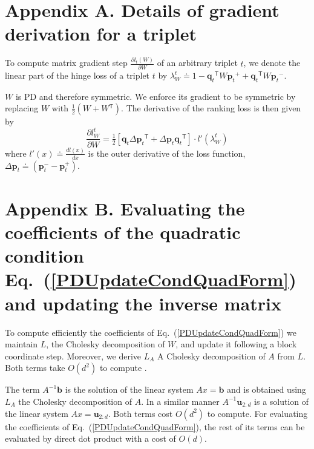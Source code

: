 \documentclass[twoside,11pt]{article}
\newcommand\mat[1]{{#1}}
\renewcommand\vec[1]{\mathbf{#1}}
\newcommand{\T}{{}^\mathsf{T}}
\newcommand{\W}{\mat{W}}
\newcommand{\eqdef}{\doteq}
\newcommand{\q}{{\vec{q}}}
\newcommand{\p}{{\vec{p}}}
\newcommand{\trip}{{t}}
\newcommand{\qt}{{\q_{\trip}}}
\newcommand{\pt}{{\p_{\trip}}}
\newcommand{\cholL}{\mat{L}}
\newcommand{\A}{\mat{A}}
\newcommand{\B}{\vec{b}}
\newcommand{\invA}{A^{-1}}
\newcommand{\uvec}{\vec{u}_{2:d}}
\renewcommand{\eqref}[1]{Eq.~(\ref{#1})}
\begin{document}

\newpage

\appendix
\section*{Appendix A. Details of gradient derivation for a triplet}
\label{appendix-grad}

To compute matrix gradient step $\frac{\partial {l_t (\W)}}{\partial \W}$ of an arbitrary triplet $t$, we denote the linear part of the hinge loss of a triplet $t$ by $\lambda_{W}^t \eqdef 
1-\qt\T \W \pt^{+} + \qt\T\W\pt^{-}.$

$\W$ is PD and therefore symmetric. We enforce its gradient to be symmetric by replacing $\W$ with $\tfrac{1}{2}(\W + \W\T)$.
The derivative of the ranking loss is then given by
\begin{equation}
\frac{\partial {l_{\W}^{t}}}{\partial \W} = \tfrac{1}{2}[\vec{q}_{t}\Delta\vec{p}_{t}\T  + \Delta\vec{p}_{t}\vec{q}_{t}\T]\cdot {l'}(\lambda_{W}^t)
\label{dlossranking}
\nonumber 
\end{equation} where $l'(x) \eqdef \frac{d{l(x)}}{dx}$ is the outer derivative of the loss function, $\Delta\vec{p}_{t} \eqdef (\vec{p}_{t}^{-} - \vec{p}_{t}^{+})$.

\section*{Appendix B. Evaluating the coefficients of the quadratic condition \eqref{PDUpdateCondQuadForm} and updating the inverse matrix}
\label{appendix-inverse}

To compute efficiently the coefficients of \eqref{PDUpdateCondQuadForm} we maintain $\cholL$, the Cholesky decomposition of $\W$, and update it following a block coordinate step. Moreover, we derive $\cholL_A$ A Cholesky decomposition of $A$ from $\cholL$. Both terms take $O(d^2)$ to compute \citep{Davis05rowchol}.

The term $\invA \B$ is the solution of the linear system $\A x = \B$ and is obtained using $\cholL_A$ the Cholesky decomposition of $\A$. In a similar manner $\invA \uvec$ is a solution of the linear system $\A x = \uvec$. Both terms cost $O(d^2)$ to compute. For evaluating the coefficients of \eqref{PDUpdateCondQuadForm}, the rest of its terms can be evaluated by direct dot product with a cost of $O(d)$. 
\end{document}
